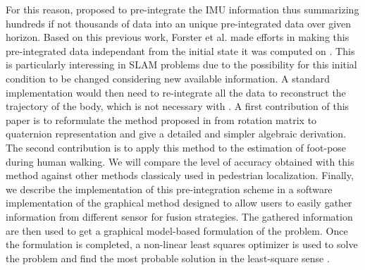 For this reason, \cite{LUPTON-09} proposed to pre-integrate the IMU information thus summarizing hundreds if not thousands of data into an unique
pre-integrated data over given horizon. Based on this previous work, Forster et al. \cite{forster2015imu} made efforts in making this pre-integrated data independant from the initial state it was computed on \cite{forster2015imu}.
This is particularly interessing in SLAM problems due to the possibility for this initial condition to be changed considering new available information. A standard implementation would then need to re-integrate all the data
to reconstruct the trajectory of the body, which is not necessary with \cite{forster2015imu}.
A first contribution of this paper is to reformulate the method proposed in \cite{forster2015imu} from rotation matrix to quaternion representation
and give a detailed and simpler algebraic derivation.
The second contribution is to apply this method to the estimation of foot-pose during human walking.
We will compare the level of accuracy obtained with this method against other methods classicaly used in pedestrian localization.
Finally, we describe the implementation of this pre-integration scheme in a software implementation of the graphical method designed to
allow users to easily gather information from different sensor for fusion strategies. The gathered information are then used to get a graphical model-based formulation of the problem. 
Once the formulation is completed, a non-linear least squares optimizer is used to solve the problem and find the most probable solution in the least-square sense \cite{ceres-solver}.





